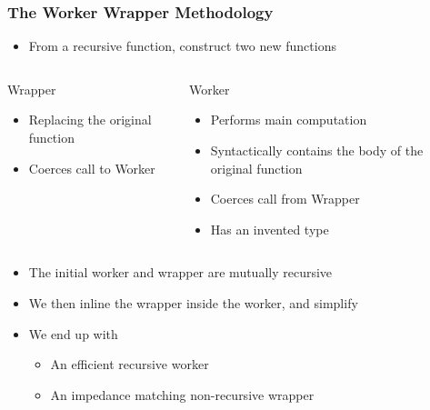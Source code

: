 \documentclass[smaller]{beamer}
\begin{document}
\begin{frame}
\frametitle{The Worker Wrapper Methodology}

\begin{itemize}
\item From a recursive function, construct two new functions
\end{itemize}
{\small\begin{columns}[t]
\begin{column}{0.4\textwidth}
\begin{block}{Wrapper}
\begin{itemize}
\item Replacing the original function
\item Coerces call to Worker
\end{itemize}
\end{block}
\end{column}
\begin{column}{0.4\textwidth}
\begin{block}{Worker}
\begin{itemize}
\item Performs main computation
\item Syntactically contains the body of the original function
\item Coerces call from Wrapper
\item Has an invented type
\end{itemize}
\end{block}
\end{column}
\end{columns}}

\begin{itemize}
\item The initial worker and wrapper are mutually recursive
\item We then inline the wrapper inside the worker, and simplify
\item We end up with
\begin{itemize}
\item An efficient recursive worker
\item An impedance matching non-recursive wrapper
\end{itemize}
\end{itemize}
\end{frame}
\end{document}
